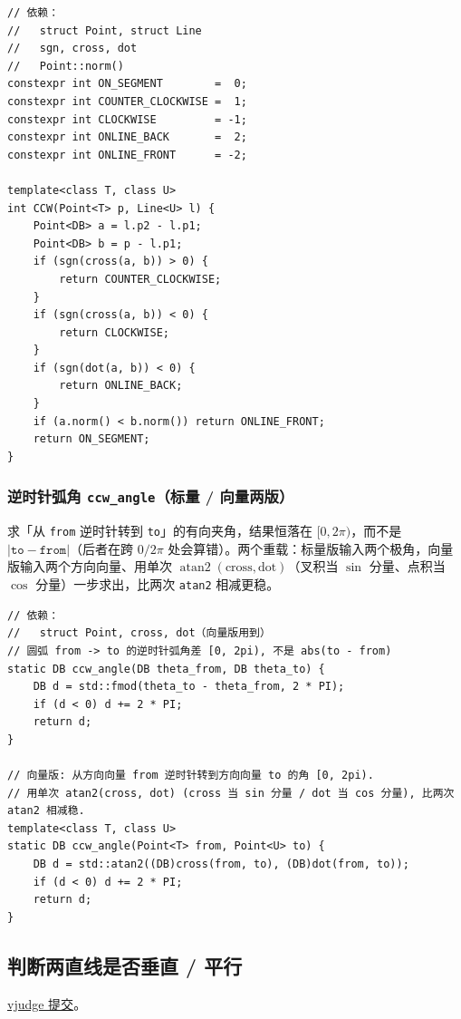 		\begin{verbatim}
// 依赖：
//   struct Point, struct Line
//   sgn, cross, dot
//   Point::norm()
constexpr int ON_SEGMENT        =  0;
constexpr int COUNTER_CLOCKWISE =  1;
constexpr int CLOCKWISE         = -1;
constexpr int ONLINE_BACK       =  2;
constexpr int ONLINE_FRONT      = -2;

template<class T, class U>
int CCW(Point<T> p, Line<U> l) {
	Point<DB> a = l.p2 - l.p1;
	Point<DB> b = p - l.p1;
	if (sgn(cross(a, b)) > 0) {
		return COUNTER_CLOCKWISE;
	}
	if (sgn(cross(a, b)) < 0) {
		return CLOCKWISE;
	}
	if (sgn(dot(a, b)) < 0) {
		return ONLINE_BACK;
	}
	if (a.norm() < b.norm()) return ONLINE_FRONT;
	return ON_SEGMENT;
}
		\end{verbatim}

		\subsubsection{逆时针弧角 \texttt{ccw\_angle}（标量 / 向量两版）}

		求「从 \texttt{from} 逆时针转到 \texttt{to}」的有向夹角，结果恒落在 $[0, 2\pi)$，而不是 $|\texttt{to} - \texttt{from}|$（后者在跨 $0/2\pi$ 处会算错）。两个重载：标量版输入两个极角，向量版输入两个方向向量、用单次 $\operatorname{atan2}(\mathrm{cross}, \mathrm{dot})$（叉积当 $\sin$ 分量、点积当 $\cos$ 分量）一步求出，比两次 \texttt{atan2} 相减更稳。

		\begin{verbatim}
// 依赖：
//   struct Point, cross, dot（向量版用到）
// 圆弧 from -> to 的逆时针弧角差 [0, 2pi), 不是 abs(to - from)
static DB ccw_angle(DB theta_from, DB theta_to) {
	DB d = std::fmod(theta_to - theta_from, 2 * PI);
	if (d < 0) d += 2 * PI;
	return d;
}

// 向量版: 从方向向量 from 逆时针转到方向向量 to 的角 [0, 2pi).
// 用单次 atan2(cross, dot) (cross 当 sin 分量 / dot 当 cos 分量), 比两次 atan2 相减稳.
template<class T, class U>
static DB ccw_angle(Point<T> from, Point<U> to) {
	DB d = std::atan2((DB)cross(from, to), (DB)dot(from, to));
	if (d < 0) d += 2 * PI;
	return d;
}
		\end{verbatim}

		\subsection{判断两直线是否垂直 / 平行}

		\href{https://vjudge.net/solution/64175524}{vjudge 提交}。

